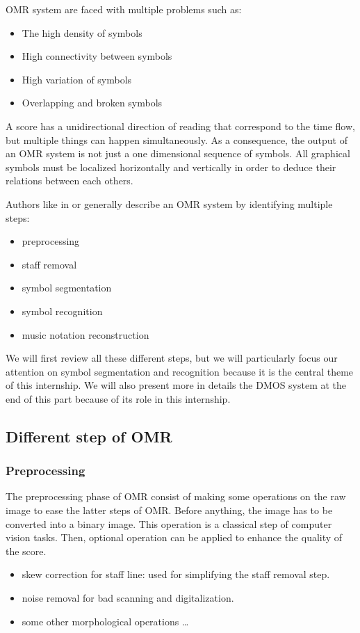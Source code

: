 \documentclass[11pt]{sdm}
\begin{document}
OMR system are faced with multiple problems such as:
\begin{itemize}
  \item The high density of symbols
  \item High connectivity between symbols
  \item High variation of symbols
  \item Overlapping and broken symbols
\end{itemize}
A score has a unidirectional direction of reading that correspond to the time flow, but multiple things can happen simultaneously.
As a consequence, the output of an OMR system is not just a one dimensional sequence of symbols.
All graphical symbols must be localized horizontally and vertically in order to deduce their relations between each others.

Authors like in \cite{rebelo_optical_2012} or \cite{fornes_analysis_2014} generally describe an OMR system by identifying multiple steps:
\begin{itemize}
  \item preprocessing
  \item staff removal
  \item symbol segmentation
  \item symbol recognition
  \item music notation reconstruction
\end{itemize}
We will first review all these different steps, but we will particularly focus our attention on symbol segmentation and recognition because it is the central theme of this internship.
We will also present more in details the DMOS system at the end of this part because of its role in this internship.

\subsection{Different step of OMR}

\subsubsection{Preprocessing}

The preprocessing phase of OMR consist of making some operations on the raw image to ease the latter steps of OMR.
Before anything, the image has to be converted into a binary image.
This operation is a classical step of computer vision tasks.
Then, optional operation can be applied to enhance the quality of the score.
\begin{itemize}
  \item skew correction for staff line: used for simplifying the staff removal step.
  \item noise removal for bad scanning and digitalization.
  \item some other morphological operations \ldots
\end{itemize}
\end{document}

